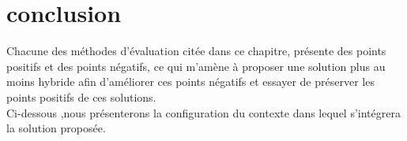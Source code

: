\section{conclusion}
Chacune des méthodes d’évaluation citée dans ce chapitre, présente des points positifs et des points négatifs, ce qui m’amène à proposer une solution plus au moins hybride afin d’améliorer ces points négatifs et essayer de préserver les points positifs de ces solutions.\\
Ci-dessous ,nous présenterons la configuration du contexte dans lequel  s'intégrera  la solution proposée.     
 

